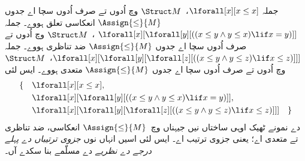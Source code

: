 \documentclass[../../../include/open-logic-section]{subfiles}
\begin{document}
\begin{ex}
جملہ $\lforall[x][x \le x]$،~$\Struct M$ وچ اُدوں تے صرف
اُدوں سچا اے جدوں $\Assign{\le}{M}$ انعکاسی تعلق ہووے۔ جملہ
$\lforall[x][\lforall[y][((x \le y \land y \le x) \lif x = y)]]$
،~$\Struct M$ وچ اُدوں تے صرف اُدوں سچا اے جدوں
$\Assign{\le}{M}$ ضد تناظری ہووے۔ جملہ
$\lforall[x][\lforall[y][\lforall[z][((x \le y \land y \le z)
      \lif x \le z)]]]$،~$\Struct M$ وچ اُدوں تے صرف اُدوں
سچا اے جدوں $\Assign{\le}{M}$ متعدی ہووے۔ ایس لئی
\begin{align*}
\{\quad &\lforall[x][x \le x], \\
   & \lforall[x][\lforall[y][((x \le y \land y \le
    x) \lif x = y)]], \\
   &\lforall[x][\lforall[y][\lforall[z][((x \le y
      \land y \le z) \lif x \le z)]]] \quad \}
\end{align*}
دے نمونے ٹھیک اوہی ساختاں نیں جیہناں وچ~$\Assign{\le}{M}$
انعکاسی، ضد تناظری تے متعدی اے؛ یعنی جزوی ترتیب اے۔ ایس لئی
اسیں انہاں نوں \emph{جزوی ترتیباں دے پہلے درجے دے نظریے} دے
مسلّمے بنا سکدے آں۔
\end{ex}
\end{document}
